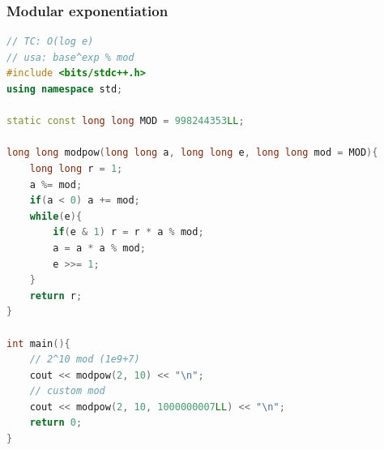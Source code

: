 \subsubsection{Modular exponentiation}
\begin{lstlisting}[style=mystyle, language=C++]
// TC: O(log e)
// usa: base^exp % mod
#include <bits/stdc++.h>
using namespace std;

static const long long MOD = 998244353LL;

long long modpow(long long a, long long e, long long mod = MOD){
	long long r = 1;
	a %= mod;
	if(a < 0) a += mod;
	while(e){
		if(e & 1) r = r * a % mod;
		a = a * a % mod;
		e >>= 1;
	}
	return r;
}

int main(){
	// 2^10 mod (1e9+7)
	cout << modpow(2, 10) << "\n";
	// custom mod
	cout << modpow(2, 10, 1000000007LL) << "\n";
	return 0;
}
\end{lstlisting}
